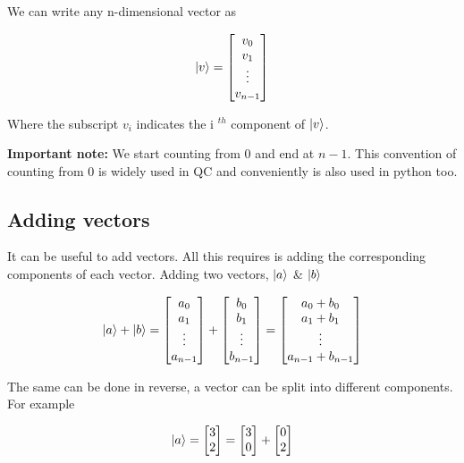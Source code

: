 \documentclass{book}
\begin{document}
We can write any n-dimensional vector as

$$
\ket{v} = \begin{bmatrix} v_0 \\ v_1 \\ \vdots \\ v_{n-1} \end{bmatrix}
$$

Where the subscript $v_i$ indicates the i $^{th}$ component of $\ket{v}$. 

\textbf{Important note:} We start counting from 0 and end at $n-1$. This convention of counting from 0 is widely used in QC and conveniently is also used in python too. 

\subsection{ Adding vectors }

It can be useful to add vectors. All this requires is adding the corresponding components of each vector. Adding two vectors, $\ket{a}$ \& $\ket{b}$

$$\ket{a} + \ket{b} = \begin{bmatrix} a_0 \\ a_1 \\ \vdots \\ a_{n-1} \end{bmatrix} + \begin{bmatrix} b_0 \\ b_1 \\ \vdots \\ b_{n-1} \end{bmatrix} = \begin{bmatrix} a_0 + b_0 \\ a_1 + b_1 \\ \vdots \\ a_{n-1} + b_{n-1} \end{bmatrix} 
$$

The same can be done in reverse, a vector can be split into different components. For example 

$$
\ket{a} = \begin{bmatrix} 3 \\ 2 \end{bmatrix} = \begin{bmatrix} 3 \\ 0 \end{bmatrix} + \begin{bmatrix} 0 \\ 2 \end{bmatrix}
$$
\end{document}
